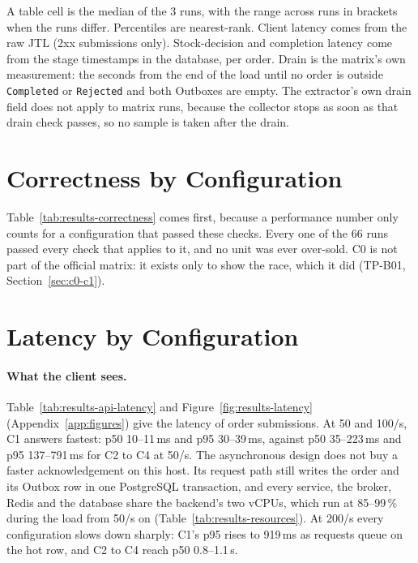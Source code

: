 \documentclass[a4paper]{report}
\begin{document}
A table cell is the median of the 3 runs, with the range across runs in
brackets when the runs differ. Percentiles are nearest-rank. Client latency
comes from the raw JTL (2xx submissions only). Stock-decision and completion
latency come from the stage timestamps in the database, per order. Drain is
the matrix's own measurement: the seconds from the end of the load until no
order is outside \texttt{Completed} or \texttt{Rejected} and both Outboxes are
empty. The extractor's own drain field does not apply to matrix runs, because
the collector stops as soon as that drain check passes, so no sample is taken
after the drain.

\section{Correctness by Configuration}

Table~\ref{tab:results-correctness} comes first, because a performance
number only counts for a configuration that passed these checks. Every one of
the 66 runs passed every check that applies to it, and no unit was ever
over-sold. C0 is not part of the official matrix: it exists only to show the
race, which it did (TP-B01, Section~\ref{sec:c0-c1}).

\begin{table}[H]
\centering
\small
{}
\caption{Validator checks per configuration: runs that passed out of runs
made, over the 66 official runs. ``n/a'' marks a check that does not apply:
C1 is synchronous, so it has no broker duplicates (4), no asynchronous
accounting (5) and no status history (7); check 6 is defined for C1 and C2
only. Check 7 requires an unbroken chain of transitions ending at the order's
state, and \texttt{Completed} has no outgoing transition, so an order can
have only one: it also shows one applied downstream result per order.}
\label{tab:results-correctness}
\end{table}

\section{Latency by Configuration}

\paragraph{What the client sees.} Table~\ref{tab:results-api-latency} and
Figure~\ref{fig:results-latency} (Appendix~\ref{app:figures}) give the latency of order submissions. At 50
and 100/s, C1 answers fastest: p50 10--11\,ms and p95 30--39\,ms, against
p50 35--223\,ms and p95 137--791\,ms for C2 to C4 at 50/s. The asynchronous
design does not buy a faster acknowledgement on this host. Its request path
still writes the order and its Outbox row in one PostgreSQL transaction, and
every service, the broker, Redis and the database share the backend's two
vCPUs, which run at 85--99\,\% during the load from 50/s on
(Table~\ref{tab:results-resources}). At 200/s every configuration slows down
sharply: C1's p95 rises to 919\,ms as requests queue on the hot row, and C2 to
C4 reach p50 0.8--1.1\,s.
\end{document}
